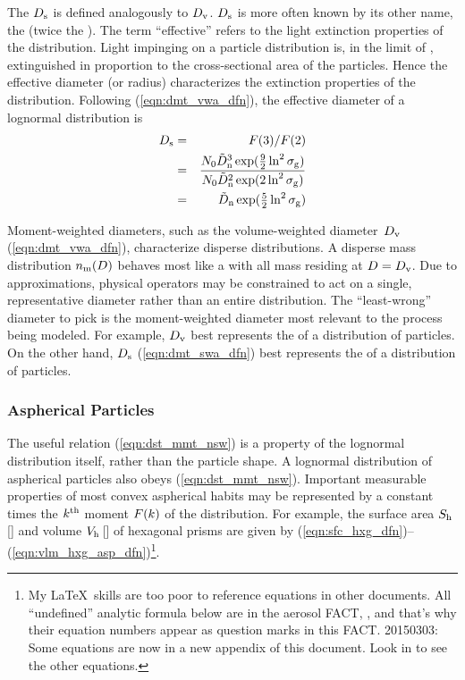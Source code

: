 \documentclass[12pt,twoside]{article}
\begin{document}
The  $D_{\mathrm{s}}$ is defined
analogously to $D_{\mathrm{v}}$.
$D_{\mathrm{s}}$ is more often known by its other name, the  (twice the ).
The term ``effective'' refers to the light extinction properties of
the distribution.
Light impinging on a particle distribution is, in the limit of
, extinguished in proportion to the
cross-sectional area of the particles.
Hence the effective diameter (or radius) characterizes the extinction
properties of the distribution. 
Following (\ref{eqn:dmt_vwa_dfn}), the effective diameter of a
lognormal distribution is
\begin{eqnarray}
D_{\mathrm{s}} & = & F(3) / F(2) \nonumber \\
& = & \frac{N_{0} \tilde{D}_{\mathrm{n}}^{3} \exp ( \mbox{$\frac{9}{2}$} \ln^{2} \sigma_{\mathrm{g}} )} 
{N_{0} \tilde{D}_{\mathrm{n}}^{2} \exp (2 \ln^{2} \sigma_{\mathrm{g}}) } \nonumber \\
& = & \tilde{D}_{\mathrm{n}} \exp ( \mbox{$\frac{5}{2}$} \ln^{2} \sigma_{\mathrm{g}} )
\label{eqn:dmt_swa_dfn}
\end{eqnarray}

Moment-weighted diameters, such as the volume-weighted
diameter~$D_{\mathrm{v}}$ (\ref{eqn:dmt_vwa_dfn}), characterize disperse
distributions.   
A disperse mass distribution $n_{\mathrm{m}}(D)$ behaves most like a
 with all mass residing at 
$D = D_{\mathrm{v}}$.  
Due to approximations, physical operators may be constrained to
act on a single, representative diameter rather than an entire 
distribution. 
The ``least-wrong'' diameter to pick is the moment-weighted diameter
most relevant to the process being modeled.
For example, $D_{\mathrm{v}}$ best represents the 
 of a distribution of particles.
On the other hand, $D_{\mathrm{s}}$ (\ref{eqn:dmt_swa_dfn}) best represents
the  of a distribution of particles.

\subsubsection[Aspherical Particles]{Aspherical  Particles}\label{sxn:asp}
The useful relation (\ref{eqn:dst_mmt_nsw}) is a property of the
lognormal distribution itself, rather than the particle shape.
A lognormal distribution of aspherical particles also obeys
(\ref{eqn:dst_mmt_nsw}). 
Important measurable properties of most convex aspherical habits 
may be represented by a constant times the $k^{\mathrm{th}}$
moment $F(k)$ of the distribution. 
For example, the surface area $S_{\mathrm{h}}$\,[\mS] and volume
$V_{\mathrm{h}}$\,[\mC] of hexagonal prisms are given by
(\ref{eqn:sfc_hxg_dfn})--(\ref{eqn:vlm_hxg_asp_dfn})\footnote{
My \LaTeX\ skills are too poor to reference equations in other
documents. 
All ``undefined'' analytic formula below are in the aerosol FACT, 
, and that's why their equation numbers appear as
question marks in this FACT. 
20150303: Some equations are now in a new appendix of this 
document.
Look in  to see the other equations.}. 
 
\end{document}

